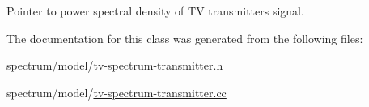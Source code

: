 Pointer to power spectral density of TV transmitter\textquotesingle{}s signal. 



The documentation for this class was generated from the following files\+:\begin{DoxyCompactItemize}
\item 
spectrum/model/\hyperlink{tv-spectrum-transmitter_8h}{tv-\/spectrum-\/transmitter.\+h}\item 
spectrum/model/\hyperlink{tv-spectrum-transmitter_8cc}{tv-\/spectrum-\/transmitter.\+cc}\end{DoxyCompactItemize}
